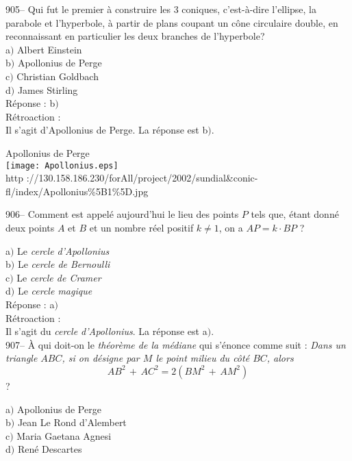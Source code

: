 ﻿\documentclass[letterpaper, 12pt]{article}
\begin{document}
905-- Qui fut le premier \`a construire les 3 coniques,
c'est-\`a-dire l'ellipse, la parabole et l'hyperbole, \`a partir
de plans coupant un c\^one circulaire double, en reconnaissant en
particulier les deux branches de l'hyperbole?\\

a$)$ Albert Einstein \\
b$)$ Apollonius de Perge \\
c$)$ Christian Goldbach \\
d$)$ James Stirling  \\

R\'eponse : b$)$\\

R\'etroaction : \\
Il s'agit d'Apollonius de Perge. La r\'eponse est b$)$.\\

        \begin{center}
        Apollonius de Perge\\
    \texttt{[image: Apollonius.eps]}\\
        {\footnotesize http
://130.158.186.230/forAll/project/2002/sundial\&conic-fl/index/Apollonius\%5B1\%5D.jpg}
    \end{center}

906-- Comment est appel\'e aujourd'hui le lieu des points $P$ tels que,
\'etant donn\'e deux points $A$ et $B$
et un nombre r\'eel positif $k\not=1$, on a $AP=k\cdot BP$ ?

a$)$ Le {\sl cercle d'Apollonius} \\
b$)$ Le {\sl cercle de Bernoulli} \\
c$)$ Le {\sl cercle de Cramer} \\
d$)$ Le {\sl cercle magique}  \\

R\'eponse : a$)$\\

R\'etroaction : \\
Il s'agit du {\sl cercle d'Apollonius}. La r\'eponse est a$)$.\\

907-- \`A qui doit-on le {\sl th\'eor\`eme de la m\'ediane} qui
s'\'enonce comme suit : {\sl \og Dans un triangle $ABC$, si on
d\'esigne par $M$ le point milieu du c\^ot\'e $BC$, alors
$$AB^2\,+\,AC^2=2(BM^2\,+\,AM^2)$$}\fg ?

a$)$ Apollonius de Perge \\
b$)$ Jean Le Rond d'Alembert \\
c$)$ Maria Gaetana Agnesi \\
d$)$ Ren\'e Descartes \\
\end{document}
